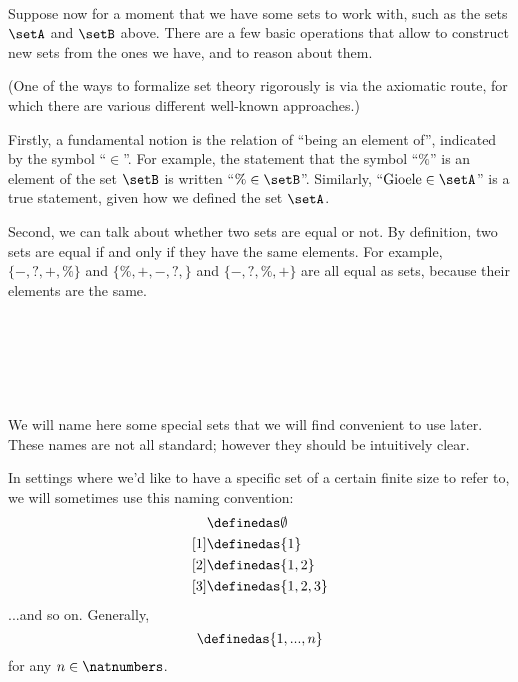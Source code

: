 {

\

Suppose now for a moment that we have some sets to work with, such as the sets $\setA$ and $\setB$ above. There are a few basic operations that allow to construct new sets from the ones we have, and to reason about them. 

(One of the ways to formalize set theory rigorously is via the axiomatic route, for which there are various different well-known approaches.) 

Firstly, a fundamental notion is the relation of ``being an element of'', indicated by the symbol ``$\in$''. For example, the statement that the symbol ``$\%$'' is an element of the set $\setB$ is written ``$\% \in \setB$''. Similarly, ``$\text{Gioele} \in \setA$'' is a true statement, given how we defined the set $\setA$. 

Second, we can talk about whether two sets are equal or not. By definition, two sets are equal if and only if they have the same elements. For example, $\{ -, ?, +, \% \}$ and $\{ \%, +, -, ?, \}$ and $\{ -, ?, \%, + \}$ are all equal as sets, because their elements are the same. 




\

\



\


We will name here some special sets that we will find convenient to use later. These names are not all standard; however they should be intuitively clear.

In settings where we'd like to have a specific set of a certain finite size to refer to, we will sometimes use this naming convention:
\begin{align*}
[0]
  & \definedas \emptyset \\
  [1] & \definedas \{ 1\} \\
  [2] & \definedas \{ 1, 2\} \\
  [3] & \definedas \{ 1, 2, 3\}
\end{align*}
...and so on. Generally,
\begin{equation}
[n]
  \definedas \{ 1, ..., n\}
\end{equation}
for any $n \in \natnumbers$.}



\clearpage
